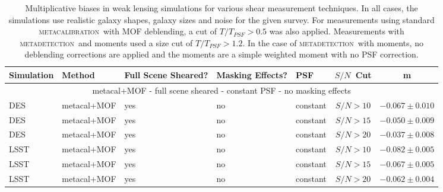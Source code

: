 \documentclass[fleqn,useAMS,usenatbib]{mnras}
\newcommand{\snr}{$S/N$}
\newcommand{\mcal}{\textsc{metacalibration}}
\newcommand{\mdet}{\textsc{metadetection}}
\begin{document}


\begin{table}
  \centering
  \caption{
    Multiplicative biases in weak lensing simulations for various shear
    measurement techniques. In all cases, the simulations use realistic
    galaxy shapes, galaxy sizes and noise for the given survey. For measurements using standard \mcal\ with
    MOF deblending, a cut of $T/T_{PSF} > 0.5$ was also applied. Measurements with
    \mdet\ and moments used a size cut of $T/T_{PSF} > 1.2$. In the case of \mdet\ with moments,
    no deblending corrections are applied and the moments are a simple weighted moment
    with no PSF correction.}
  \label{tab:shearmeas}

  \begin{tabular}{|l|l|l|l|l|c|c|}
    \hline
    Simulation & Method & Full Scene Sheared? & Masking Effects? & PSF & \snr\ Cut & m \\
    \hline

    \hline
    \multicolumn{7}{c}{metacal+MOF - full scene sheared - constant PSF - no masking effects}\\
    \hline
    DES   & metacal+MOF & yes & no & constant & \snr$ > 10$ & $-0.067 \pm 0.010$  \\
    DES   & metacal+MOF & yes & no & constant & \snr$ > 15$ & $-0.050 \pm 0.009$  \\
    DES   & metacal+MOF & yes & no & constant & \snr$ > 20$ & $-0.037 \pm 0.008$  \\
    \hline
    LSST  & metacal+MOF & yes & no & constant & \snr$ > 10$ & $-0.082 \pm 0.005$  \\
    LSST  & metacal+MOF & yes & no & constant & \snr$ > 15$ & $-0.067 \pm 0.005$  \\
    LSST  & metacal+MOF & yes & no & constant & \snr$ > 20$ & $-0.062 \pm 0.004$  \\
    \hline


\end{tabular}
\end{table}
\end{document}
